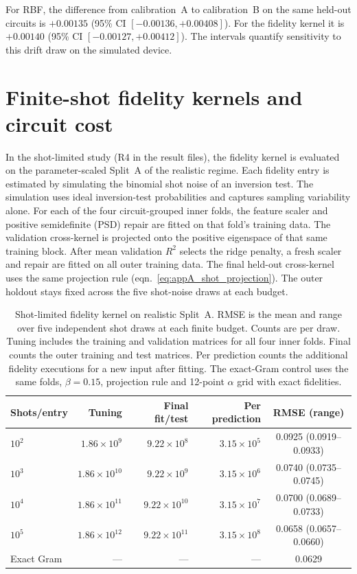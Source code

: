 \documentclass[Thesis.tex]{subfiles}
\begin{document}
For RBF, the difference from calibration~A to calibration~B on the same
held-out circuits is
$+0.00135$ (95\% CI $[-0.00136,\allowbreak +0.00408]$).
For the fidelity kernel it is
$+0.00140$ (95\% CI $[-0.00127,\allowbreak +0.00412]$).
The intervals quantify sensitivity to this drift draw on the simulated device.

\section{Finite-shot fidelity kernels and circuit cost}
\label{sec:ch5_shotkernel}

In the shot-limited study (R4 in the result files), the fidelity kernel is evaluated on the parameter-scaled Split~A of the
realistic regime. Each fidelity entry is estimated by simulating the
binomial shot noise of an inversion test. The simulation uses ideal
inversion-test probabilities and captures sampling variability alone.
For each of the four circuit-grouped inner folds, the feature scaler and
positive semidefinite (PSD) repair are fitted on that fold's training data.
The validation cross-kernel is projected onto the positive eigenspace of
that same training block. After mean validation $R^2$ selects the ridge
penalty, a fresh scaler and repair are fitted on all outer training data.
The final held-out cross-kernel uses the same projection rule
(eqn.~\eqref{eq:appA_shot_projection}). The outer holdout stays fixed
across the five shot-noise draws at each budget.

\begin{table}[htbp]
\centering
\caption[Shot-limited quantum kernel]{Shot-limited fidelity kernel on realistic Split~A.
RMSE is the mean and range over five independent shot draws at each finite budget.
Counts are per draw. Tuning includes the training and validation matrices for all
four inner folds. Final counts the outer training and test matrices. Per prediction
counts the additional fidelity
executions for a new input after fitting. The exact-Gram control uses the same folds,
$\beta=0.15$, projection rule and 12-point $\alpha$ grid with exact fidelities.}
\label{tab:ch5_shotkernel}
\small
\begin{tabular}{lrrrc}
\toprule
\textbf{Shots/entry} & \textbf{Tuning} & \textbf{Final fit/test} & \textbf{Per prediction}
    & \textbf{RMSE (range)} \\
\midrule
$10^{2}$ & $1.86\times 10^{9}$ & $9.22\times 10^{8}$ & $3.15\times 10^{5}$ & 0.0925 (0.0919--0.0933) \\
$10^{3}$ & $1.86\times 10^{10}$ & $9.22\times 10^{9}$ & $3.15\times 10^{6}$ & 0.0740 (0.0735--0.0745) \\
$10^{4}$ & $1.86\times 10^{11}$ & $9.22\times 10^{10}$ & $3.15\times 10^{7}$ & 0.0700 (0.0689--0.0733) \\
$10^{5}$ & $1.86\times 10^{12}$ & $9.22\times 10^{11}$ & $3.15\times 10^{8}$ & 0.0658 (0.0657--0.0660) \\
Exact Gram & --- & --- & --- & 0.0629 \\
\bottomrule
\end{tabular}
\end{table}
\end{document}
